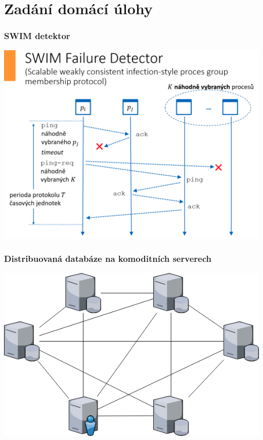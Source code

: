 \documentclass[usenames,dvipsnames,9pt]{beamer}
\begin{document}
\section{Zadání domácí úlohy}

\begin{frame}
  \frametitle{SWIM detektor}
  \begin{center}
  \includegraphics[width=\linewidth]{10/figs/swim.png}
  \end{center}
\end{frame}

\begin{frame}
  \frametitle{Distribuovaná databáze na komoditních serverech}
  \begin{center}
  \includegraphics[width=.95\linewidth]{10/figs/dist_db.png}
  \end{center}
\end{frame}
\end{document}
